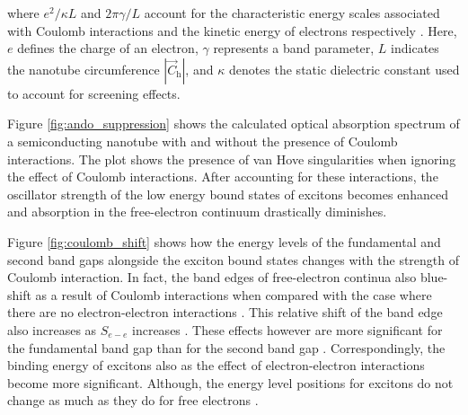 where $e^2 /\kappa L$ and $2 \pi \gamma / L$ account for the characteristic energy scales associated with Coulomb interactions and the kinetic energy of electrons respectively \cite{ando2005theory}. Here, $e$ defines the charge of an electron, $\gamma$ represents a band parameter, $L$ indicates the nanotube circumference $|\vec{C}_\text{h}|$, and $\kappa$ denotes the static dielectric constant used to account for screening effects.


Figure \ref{fig:ando_suppression} shows the calculated optical absorption spectrum of a semiconducting nanotube with and without the presence of Coulomb interactions. The plot shows the presence of van Hove singularities when ignoring the effect of Coulomb interactions. After accounting for these interactions, the oscillator strength of the low energy bound states of excitons becomes enhanced and absorption in the free-electron continuum drastically diminishes.

Figure \ref{fig:coulomb_shift} shows how the energy levels of the fundamental and second band gaps alongside the exciton bound states changes with the strength of Coulomb interaction. In fact, the band edges of free-electron continua also blue-shift as a result of Coulomb interactions when compared with the case where there are no electron-electron interactions \cite{ando1997excitons}. This relative shift of the band edge also increases as $S_{e-e}$ increases \cite{ando2005theory}. These effects however are more significant for the fundamental band gap than for the second band gap \cite{ando2005theory}. Correspondingly, the binding energy of excitons also as the effect of electron-electron interactions become more significant. Although, the energy level positions for excitons do not change as much as they do for free electrons \cite{ando2005theory}.

